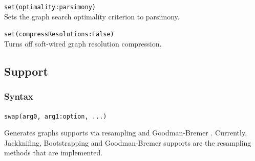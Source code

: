 	\begin{example}
		\item{\texttt{set(optimality:parsimony)}\\Sets the graph search optimality criterion to parsimony.}
						
		\item{\texttt{set(compressResolutions:False)}\\Turns off soft-wired graph resolution compression.}
	\end{example}

\subsection{Support}
	\subsubsection{Syntax}
		\texttt{swap(arg0, arg1:option, ...)}
		
	\begin{phygdescription}
		{Generates graphs supports via resampling \citep{Farrisetal1996} and Goodman-Bremer 
		\citep{Goodmanetal1982, bremer1994}. Currently, Jackknifing, Bootstrapping and 
		Goodman-Bremer supports are the resampling methods that are implemented.}
	\end{phygdescription}
		

